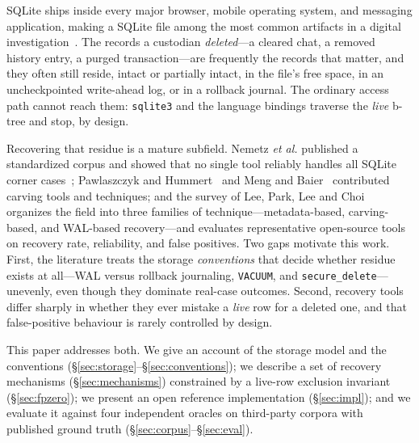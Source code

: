 \documentclass[10pt,a4paper]{article}
\newcommand{\code}[1]{\texttt{#1}}
\begin{document}
SQLite ships inside every major browser, mobile operating system, and messaging
application, making a SQLite file among the most common artifacts in a digital
investigation~\cite{sqlite_mostdeployed}. The records a custodian \emph{deleted}---a
cleared chat, a removed history entry, a purged transaction---are frequently the
records that matter, and they often still reside, intact or partially intact, in
the file's free space, in an uncheckpointed write-ahead log, or in a rollback
journal. The ordinary access path cannot reach them: \code{sqlite3} and the
language bindings traverse the \emph{live} b-tree and stop, by design.

Recovering that residue is a mature subfield. Nemetz \emph{et al.} published a
standardized corpus and showed that no single tool reliably handles all
SQLite corner cases~\cite{nemetz2018corpus}; Pawlaszczyk and
Hummert~\cite{pawlaszczyk2021fqlite} and Meng and Baier~\cite{meng2019bring2lite}
contributed carving tools and techniques; and the survey of Lee, Park, Lee and
Choi~\cite{choi2025survey} organizes the field into three families of
technique---metadata-based, carving-based, and WAL-based recovery---and evaluates
representative open-source tools on recovery rate, reliability, and false
positives. Two gaps motivate this work. First, the literature treats the storage
\emph{conventions} that decide whether residue exists at all---WAL versus
rollback journaling, \code{VACUUM}, and \code{secure\_delete}---unevenly, even
though they dominate real-case outcomes. Second, recovery tools differ sharply in
whether they ever mistake a \emph{live} row for a deleted one, and that
false-positive behaviour is rarely controlled by design.

This paper addresses both. We give an account of the storage model and the
conventions (\S\ref{sec:storage}--\S\ref{sec:conventions}); we describe a set of
recovery mechanisms (\S\ref{sec:mechanisms}) constrained by a live-row exclusion
invariant (\S\ref{sec:fpzero}); we present an open reference implementation
(\S\ref{sec:impl}); and we evaluate it against four independent oracles on
third-party corpora with published ground truth
(\S\ref{sec:corpus}--\S\ref{sec:eval}).
\end{document}
